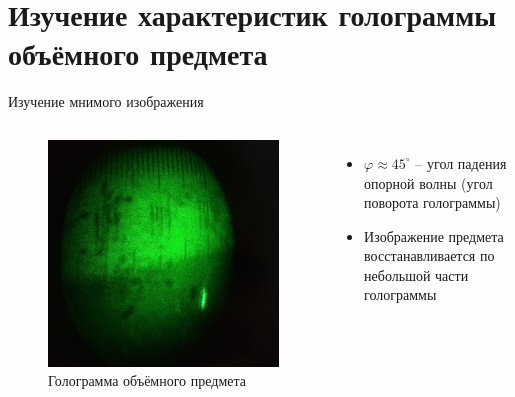 \documentclass[11pt]{beamer} %
\begin{document}
    \section{Изучение характеристик голограммы объёмного предмета}

    \begin{frame}{Изучение мнимого изображения}
    \small
        \begin{columns}
        \begin{figure}[H]
            \centering
            \includegraphics[width = \textwidth]{images/imaginary_image_v.jpg}
            \caption{Голограмма объёмного предмета}
        \end{figure}
        
        \begin{itemize}
            \item $\varphi \approx 45^\circ$ -- угол падения опорной волны (угол поворота голограммы)
            \item Изображение предмета восстанавливается по небольшой части голограммы
        \end{itemize}
        \end{columns}
    \end{frame}
\end{document}
